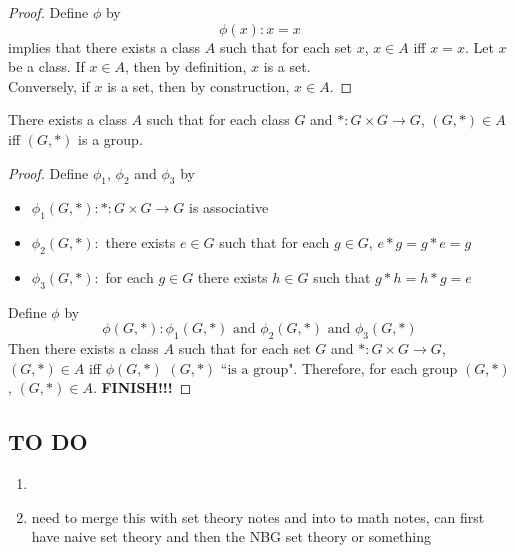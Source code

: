 \documentclass{book}
\begin{document}
	\begin{proof}
		Define $\phi$ by $$\phi(x) : x = x$$ 
		 implies that there exists a class $A$ such that for each set $x$, $x \in A$ iff $x = x$. Let $x$ be a class. If $x \in A$, then by definition, $x$ is a set. \\
		Conversely, if $x$ is a set, then by construction, $x \in A$.
	\end{proof}
	
	\begin{ex} 
		There exists a class $A$ such that for each class $G$ and $*: G \times G \rightarrow G$, $(G, *) \in A$ iff $(G, *)$ is a group.
	\end{ex}
	
	\begin{proof}
		Define $\phi_1$, $\phi_2$ and $\phi_3$ by 
		\begin{itemize}
			\item $\phi_1(G, *): *:G \times G \rightarrow G$ is associative
			\item $\phi_2(G, *):$ there exists $e \in G$ such that for each $g \in G$, $e * g = g * e = g$
			\item $\phi_3(G, *):$ for each $g \in G$ there exists $h \in G$ such that $g * h = h * g = e$
		\end{itemize}
		Define $\phi$ by 
		$$\phi(G, *) : \phi_1(G, *) \text{ and } \phi_2(G, *) \text{ and } \phi_3(G, *)$$
		Then there exists a class $A$ such that for each set $G$ and  $*: G \times G \rightarrow G$, $(G, *) \in A$ iff $\phi(G, *)$ $(G, *) \text{ ``is a group"}$. Therefore, for each group $(G, *)$, $(G, *) \in A$.
		\textbf{FINISH!!!}
	\end{proof}
	
	
	\subsection{TO DO}
	\begin{enumerate} 
		\item {}
		\item need to merge this with set theory notes and into to math notes, can first have naive set theory and then the NBG set theory or something
	\end{enumerate}
	
	
	
	
	
	
	
\end{document}
